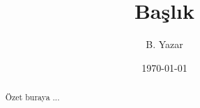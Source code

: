 \documentclass{article}
\title{Başlık}
\author{B. Yazar}
\date{\today}
\begin{document}
\maketitle

\begin{abstract}
Özet buraya ...
\end{abstract}
\end{document}
